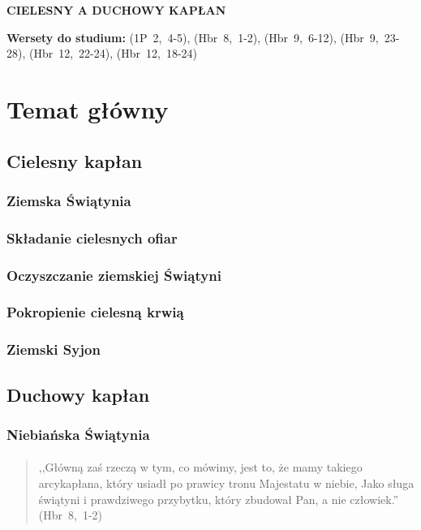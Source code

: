 \documentclass[10pt,a4paper,oneside]{article}
\begin{document}
\centerline{\textbf{\MakeUppercase{Cielesny a duchowy kapłan}}}
\begin{center}
\textbf{Wersety do studium:} \mbox{(1P 2, 4-5)}, \mbox{(Hbr 8, 1-2)}, \mbox{(Hbr 9, 6-12)}, \mbox{(Hbr 9, 23-28)}, \mbox{(Hbr 12, 22-24)}, \mbox{(Hbr 12, 18-24)}
\end{center}
\section{Temat główny}
\subsection{Cielesny kapłan}
\subsubsection{Ziemska Świątynia}
\subsubsection{Składanie cielesnych ofiar}
\subsubsection{Oczyszczanie ziemskiej Świątyni}
\subsubsection{Pokropienie cielesną krwią}
\subsubsection{Ziemski Syjon}
\subsection{Duchowy kapłan}
\subsubsection{Niebiańska Świątynia}
\paragraph{}
\begin{quote}
,,Główną zaś rzeczą w tym, co mówimy, jest to, że mamy takiego arcykapłana, który usiadł po prawicy tronu Majestatu w niebie, Jako sługa świątyni i prawdziwego przybytku, który zbudował Pan, a nie człowiek.'' \mbox{(Hbr 8, 1-2)}
\end{quote}
\end{document}
